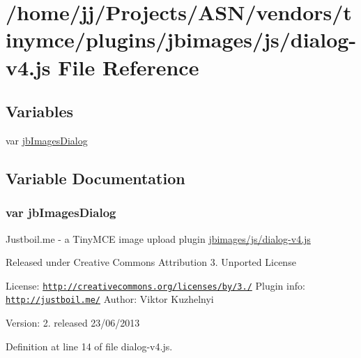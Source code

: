 \hypertarget{dialog-v4_8js}{}\section{/home/jj/\+Projects/\+A\+S\+N/vendors/tinymce/plugins/jbimages/js/dialog-\/v4.js File Reference}
\label{dialog-v4_8js}
\subsection*{Variables}
\begin{DoxyCompactItemize}
\item 
var \hyperlink{dialog-v4_8js_abe9798865dc6e0e60f8da0b2444e97da}{jb\+Images\+Dialog}
\end{DoxyCompactItemize}


\subsection{Variable Documentation}
\subsubsection[{\texorpdfstring{jb\+Images\+Dialog}{jbImagesDialog}}]{\setlength{\rightskip}{0pt plus 5cm}var jb\+Images\+Dialog}\hypertarget{dialog-v4_8js_abe9798865dc6e0e60f8da0b2444e97da}{}\label{dialog-v4_8js_abe9798865dc6e0e60f8da0b2444e97da}
Justboil.\+me -\/ a Tiny\+M\+CE image upload plugin \hyperlink{dialog-v4_8js}{jbimages/js/dialog-\/v4.\+js}

Released under Creative Commons Attribution 3. Unported License

License\+: \href{http://creativecommons.org/licenses/by/3.0/}{\tt http\+://creativecommons.\+org/licenses/by/3./} Plugin info\+: \href{http://justboil.me/}{\tt http\+://justboil.\+me/} Author\+: Viktor Kuzhelnyi

Version\+: 2. released 23/06/2013 

Definition at line 14 of file dialog-\/v4.\+js.

